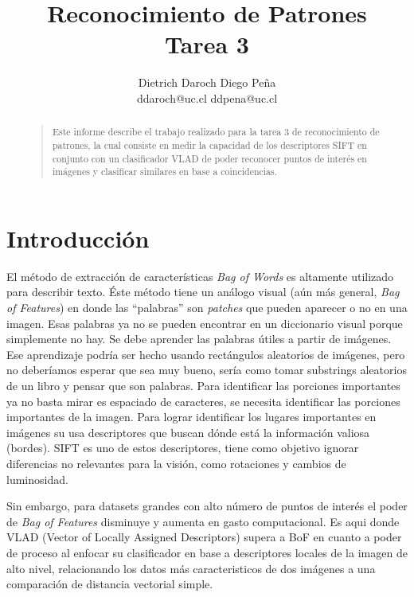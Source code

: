 

\title{Reconocimiento de Patrones\\Tarea 3}
\author{Dietrich Daroch \qquad Diego Peña\\
ddaroch@uc.cl \qquad ddpena@uc.cl\\
}




\maketitle
\begin{abstract}
\begin{quote}
Este informe describe el trabajo realizado para la tarea 3 de reconocimiento de patrones, la cual consiste en medir la capacidad de los descriptores SIFT en conjunto con un clasificador VLAD de poder reconocer puntos de interés en imágenes y clasificar similares en base a coincidencias.
\end{quote}
\end{abstract}



\section{Introducción}
\noindent El método de extracción de características \emph{Bag of Words} es altamente utilizado para describir texto. Éste método tiene un análogo visual (aún más general, \emph{Bag of Features}) en donde las ``palabras'' son \emph{patches} que pueden aparecer o no en una imagen.
Esas palabras ya no se pueden encontrar en un diccionario visual porque simplemente no hay. Se debe aprender las palabras útiles a partir de imágenes. Ese aprendizaje podría ser hecho usando rectángulos aleatorios de imágenes, pero no deberíamos esperar que sea muy bueno, sería como tomar substrings aleatorios de un libro y pensar que son palabras.
Para identificar las porciones importantes ya no basta mirar es espaciado de caracteres, se necesita identificar las porciones importantes de la imagen.
Para lograr identificar los lugares importantes en imágenes su usa descriptores que buscan dónde está la información valiosa (bordes). SIFT es uno de estos descriptores, tiene como objetivo ignorar diferencias no relevantes para la visión, como rotaciones y cambios de luminosidad.

Sin embargo, para datasets grandes con alto número de puntos de interés el poder de \emph{Bag of Features} disminuye y aumenta en gasto computacional. Es aqui donde VLAD (Vector of Locally Assigned Descriptors) supera a BoF en cuanto a poder de proceso al enfocar su clasificador en base a descriptores locales de la imagen de alto nivel, relacionando los datos más caracteristicos de dos imágenes a una comparación de distancia vectorial simple.

